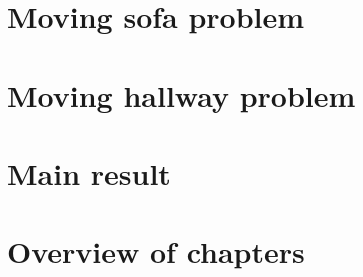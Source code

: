 
\section{Moving sofa problem}
\label{sec:moving-sofa-problem}


\section{Moving hallway problem}
\label{sec:moving-hallway-problem}


\section{Main result}
\label{sec:main-result}


\section{Overview of chapters}
\label{sec:overview-of-chapters}


